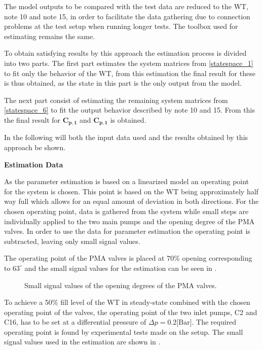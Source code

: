 The model outputs to be compared with the test data are reduced to the WT, note 10 and note 15, in order to facilitate the data gathering due to connection problems at the test setup when running longer tests. The toolbox used for estimating remains the same. 

To obtain satisfying results by this approach the estimation process is divided into two parts. 
The first part estimates the system matrices from \eqref{statespace_1} to fit only the behavior of the WT, from this estimation the final result for these is thus obtained, as the state in this part is the only output from the model.

The next part consist of estimating the remaining system matrices from \eqref{statespace_6} to fit the output behavior described by note 10 and 15. From this the final result for $ \bm{C_{p,1}} $ and $ \bm{C_{p,1}}$ is obtained. 

In the following will both the input data used and the results obtained by this approach be shown.    


\textbf{Estimation Data}

As the parameter estimation is based on a linearized model an operating point for the system is chosen. This point is based on the WT being approximately half way full which allows for an equal amount of deviation in both directions. For the chosen operating point, data is gathered from the system while small steps are individually applied to the two main pumps and the opening degree of the PMA valves. In order to use the data for parameter estimation the operating point is subtracted, leaving only small signal values.  

The operating point of the PMA valves is placed at $70\%$ opening corresponding to $63^{\circ}$ and the small signal values for the estimation can be seen in .

\begin{figure}[H]
\centering
 
\caption{Small signal values of the opening degrees of the PMA valves.}
\label{fig:est_OD_data_final}
\end{figure}

To achieve a 50\% fill level of the WT in steady-state combined with the chosen operating point of the valves, the operating point of the two inlet pumps, C2 and C16, has to be set at a differential pressure of $\Delta p = 0.2 \text{[Bar]}$. The required operating point is found by experimental tests made on the setup. The small signal values used in the estimation are shown in . 

